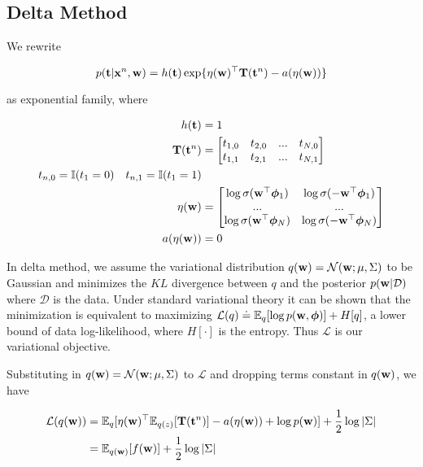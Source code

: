 \subsection{Delta Method}

We rewrite 

\begin{equation}
p({\bf t} | {\bf x}^n, {\bf w}) = h({\bf t}) \exp\{\eta({\bf
w})^{\top} {\bf T}({\bf t}^n) - a(\eta({\bf w}))\}
\end{equation}

as exponential family, where 

\begin{align}
\begin{split}
h({\bf t}) &= 1
\\
{\bf T}({\bf t}^n) &= 
\begin{bmatrix}
t_{1,0} & t_{2,0} & ... & t_{N,0} \\
t_{1,1} & t_{2,1} & ... & t_{N,1}
\end{bmatrix}
\\
t_{n, 0} = \mathbb{I}(t_1=0) \quad t_{n,1} = \mathbb{I}(t_1=1)
\\
\eta(\mathbf{w}) &= 
\begin{bmatrix}
\log \sigma(\mathbf{w}^{\top} \bm{\phi}_1) & \log \sigma(-\mathbf{w}^{\top} \bm{\phi}_1) \\
... & ... \\
\log \sigma(\mathbf{w}^{\top} \bm{\phi}_N) & \log \sigma(-\mathbf{w}^{\top} \bm{\phi}_N) \\
\end{bmatrix}
\\
a(\eta(\mathbf{w})) &= 0
\end{split}
\end{align}

In delta method, we assume the variational distribution $q(\mathbf{w}) =
\mathcal{N}(\mathbf{w};\mu, \Sigma)$ to be Gaussian and minimizes the $KL$ divergence
between $q$ and the posterior $p(\mathbf{w}|\mathcal{D})$ where $\mathcal{D}$ is the
data. Under standard variational theory it can be shown that the minimization
is equivalent to maximizing $\mathcal{L}(q) \doteq \mathbb{E}_q[\log p(\mathbf{w},
\bm{\phi})] + H[q]$, a lower bound of data log-likelihood, where $H[\cdot]$ is the
entropy. Thus $\mathcal{L}$ is our variational objective.

Substituting in $q(\mathbf{w}) = \mathcal{N}(\mathbf{w};\mu, \Sigma)$ to $\mathcal{L}$ and 
dropping terms constant in $q(\mathbf{w})$, we have

\begin{align}\begin{split}
\mathcal{L}(q(\mathbf{w})) &= \mathbb{E}_q[\eta(\mathbf{w})^{\top} \mathbb{E}_{q(z)}
[\mathbf{T}(\mathbf{t}^n)] - a(\eta(\mathbf{w})) + \log p(\mathbf{w})] + \frac{1}{2} \log |\Sigma| 
\\
&= \mathbb{E}_{q(\mathbf{w})}[f(\mathbf{w})] + \frac{1}{2} \log |\Sigma|
\end{split} \end{align}

